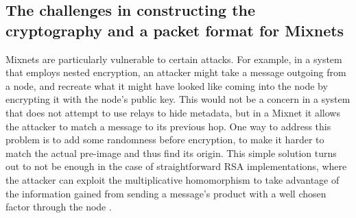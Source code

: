 \documentclass{article}
\begin{document}


\subsection{The challenges in constructing the cryptography and a packet format for Mixnets}

Mixnets are particularly vulnerable to certain attacks. For example, in a system that employs nested encryption, an attacker might take a message outgoing from a node, and recreate what it might have looked like coming into the node by encrypting it with the node's public key. This would not be a concern in a system that does not attempt to use relays to hide metadata, but in a Mixnet it allows the attacker to match a message to its previous hop. One way to address this problem is to add some randomness before encryption, to make it harder to match the actual pre-image and thus find its origin. 
 This simple solution turns out to not be enough in the case of straightforward RSA implementations, where the attacker can exploit the multiplicative homomorphism to take advantage of the information gained from sending a message's product with a well chosen factor through the node . %
\end{document}
